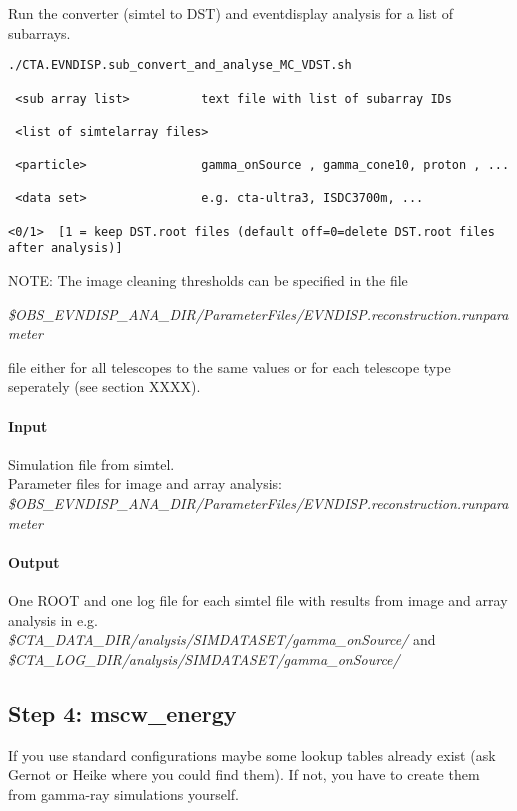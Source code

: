 \documentclass[titlepage,a4paper,twoside,11pt]{report}
\begin{document}
Run the converter (simtel to DST) and eventdisplay analysis for a list of subarrays.

\begin{lstlisting}
./CTA.EVNDISP.sub_convert_and_analyse_MC_VDST.sh

 <sub array list>          text file with list of subarray IDs
  
 <list of simtelarray files>  

 <particle>                gamma_onSource , gamma_cone10, proton , ...

 <data set>                e.g. cta-ultra3, ISDC3700m, ...
 
<0/1>  [1 = keep DST.root files (default off=0=delete DST.root files after analysis)]
\end{lstlisting}

NOTE: The image cleaning thresholds can be specified in the file 

{\it \$OBS\_EVNDISP\_ANA\_DIR/ParameterFiles/EVNDISP.reconstruction.runparameter}

file either for all telescopes to the same values or for each telescope type seperately
(see section XXXX). 

\paragraph{Input}
Simulation file from simtel. \\
Parameter files for image and array analysis:\\
{\it \$OBS\_EVNDISP\_ANA\_DIR/ParameterFiles/EVNDISP.reconstruction.runparameter}

\paragraph{Output}

One ROOT and one log file for each simtel file with results from image and array analysis in e.g. \\
{\it \$CTA\_DATA\_DIR/analysis/SIMDATASET/gamma\_onSource/} and \\
{\it \$CTA\_LOG\_DIR/analysis/SIMDATASET/gamma\_onSource/} 

\subsection{Step 4: mscw\_energy}

If you use standard configurations maybe some lookup tables already exist (ask Gernot or Heike where you could find them).
If not, you have to create them from gamma-ray simulations yourself.
\end{document}
